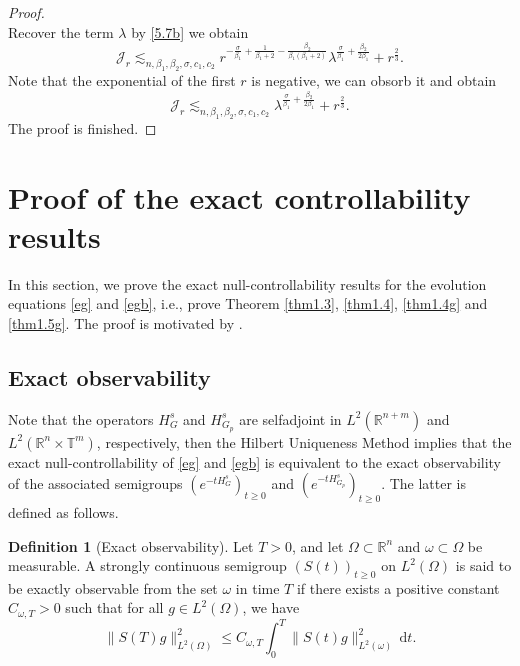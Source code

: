 \documentclass{article}
\numberwithin{equation}{section}
\renewcommand{\d}{\,\mathrm{d}}
\newcommand\R{\ensuremath{\mathbb{R}}}
\newcommand\T{\ensuremath{\mathbb{T}}}
\numberwithin{equation}{section}
\theoremstyle{definition}
\newtheorem{definition}{Definition}[section]
\begin{document}
\begin{proof}
\begin{equation}
\end{equation}
Recover the term $\lambda$ by \eqref{5.7b} we obtain
\begin{equation}
	\mathcal{J}_r\lesssim_{n,\beta_1,\beta_2,\sigma,c_1,c_2} r^{-\frac{\sigma }{\beta_1}+\frac{1}{\beta_1+2}-\frac{\beta_2}{\beta_1(\beta_1+2)}}\lambda^{\frac{\sigma }{\beta_1}+\frac{\beta_2}{2\beta_1}}+r^{\frac{2}{3}}.
\end{equation}
Note that the exponential of the first $r$ is negative, we can obsorb it and obtain
\begin{equation}
\mathcal{J}_r\lesssim_{n,\beta_1,\beta_2,\sigma,c_1,c_2} \lambda^{\frac{\sigma }{\beta_1}+\frac{\beta_2}{2\beta_1}}+r^{\frac{2}{3}}.	
\end{equation}
The proof is finished.
\end{proof}
\section{Proof of the exact controllability results}\label{sec2d}
In this section, we prove the exact null-controllability results for the evolution equations \eqref{eg} and \eqref{egb}, i.e., prove Theorem \ref{thm1.3}, \ref{thm1.4}, \ref{thm1.4g} and \ref{thm1.5g}. The proof is motivated by \cite{alphonse2023quantitative}.

\subsection{Exact observability}
Note that the operators $H_{G}^{s}$ and $H_{G_p}^{s}$ are selfadjoint in $L^2(\R^{n+m})$ and $L^2\left( \R^{n}\times \T ^{m} \right)$, respectively, then the Hilbert Uniqueness Method implies that the exact null-controllability of \eqref{eg} and \eqref{egb} is equivalent to the exact observability of the associated semigroups $(e^{-tH_{G}^{s}})_{t\ge 0}$ and $(e ^{-t H_{G_p}^s})_{t\ge 0}$. The latter is defined as follows.
\begin{definition}[Exact observability]
	Let $T >0$, and let $\Omega \subset \R^{n}$ and $\omega \subset \Omega$ be measurable. A strongly continuous semigroup $(S(t))_{t\ge 0}$ on $L^2(\Omega)$ is said to be exactly observable from the set $\omega$ in time $T$ if there exists a positive constant $C_{\omega,T}>0$ such that for all $g \in L^2(\Omega)$, we have
	\[
	\|S(T) g\|^2_{L^2(\Omega)}\le C_{\omega,T}\int_{0}^{T}\|S(t)g\|^2_{L^2(\omega)}\d t.
	\] 
\end{definition}
\end{document}
